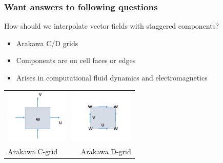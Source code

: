 \documentclass[aspectratio=169]{beamer}
\begin{document}
\begin{frame}[t]
  \frametitle{Want answers to following questions}
    \begin{block}{How should we interpolate vector fields with staggered components?}
      \begin{itemize}%
	  \item Arakawa C/D grids
      \item Components are on cell faces or edges
      \item Arises in computational fluid dynamics and electromagnetics
    \end{itemize}
  \end{block}
  \begin{tabular}{lr}
      \includegraphics[width=30mm]{uvArakawaC.PNG} &               \includegraphics[width=30mm]{uvArakawaD.PNG} \\
      {Arakawa C-grid} & {Arakawa D-grid}  
\end{tabular}
\end{frame}
\end{document}
